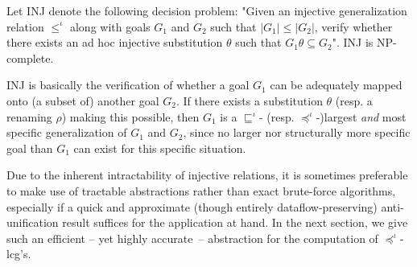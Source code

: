 \begin{theorem}\label{thm-inj-np-complete}
	Let INJ denote the following decision problem: "Given an injective generalization relation $\leqslant^\iota$ along with goals $G_1$ and $G_2$ such that $|G_1|\le|G_2|$, verify whether there exists an ad hoc injective substitution $\theta$ such that $G_1\theta\subseteq G_2$". INJ is NP-complete.
\end{theorem}

INJ is basically the verification of whether a goal $G_1$ can be adequately mapped onto (a subset of) another goal $G_2$. If there exists a substitution $\theta$ (resp. a renaming $\rho$) making this possible, then $G_1$ is a $\sqsubseteq^\iota$- (resp. $\preceq^\iota$-)largest \textit{and} most specific generalization of $G_1$ and $G_2$, since no larger nor structurally more specific goal than $G_1$ can exist for this specific situation.

Due to the inherent intractability of injective relations, it is sometimes preferable to make use of tractable abstractions rather than exact brute-force algorithms, especially if a quick and approximate (though entirely dataflow-preserving) anti-unification result suffices for the application at hand. In the next section, we give such an efficient -- yet highly accurate~-- abstraction for the computation of $\preceq^\iota$-lcg's. 
